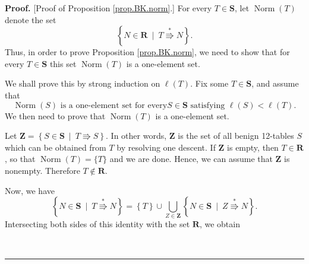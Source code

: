 \documentclass[numbers=enddot,12pt,final,onecolumn,notitlepage]{scrartcl}%
\theoremstyle{definition}
\newenvironment{proof}[1][Proof]{\noindent\textbf{#1.} }{\ \rule{0.5em}{0.5em}}
\begin{document}
\begin{proof}
[Proof of Proposition \ref{prop.BK.norm}.] For every $T\in\mathbf{S}$, let
$\operatorname*{Norm}\left(  T\right)  $ denote the set%
\[
\left\{  N\in\mathbf{R}\ \mid\ T\overset{\ast}{\Rrightarrow}N\right\}  .
\]
Thus, in order to prove Proposition \ref{prop.BK.norm}, we need to show that for every $T\in\mathbf{S}$ this set $\operatorname*{Norm}%
\left(  T\right)  $ is a one-element set.

We shall prove this by strong induction on $\ell\left(  T\right)  $. Fix
some $T\in\mathbf{S}$, and assume that
\begin{equation}
\operatorname*{Norm}\left(  S\right)  \text{ is a one-element set for every
}S\in\mathbf{S}\text{ satisfying }\ell\left(  S\right)  <\ell\left(  T\right)
\text{.}\label{pf.prop.BK.norm.indhyp}%
\end{equation}
We then need to prove that $\operatorname*{Norm}\left(  T\right)  $ is a
one-element set.

Let $\mathbf{Z} = \left\{  S\in\mathbf{S}\ \mid\ T\Rrightarrow
S\right\}  $. In other words, $\mathbf{Z}$ is the set of all benign 12-tables
$S$ which can be obtained from $T$ by resolving one descent. If
$\mathbf{Z}$ is empty, then $T \in \mathbf{R}$, so that
$\operatorname*{Norm}\left(  T\right) = \{T\}$ and we are done. Hence, we can
assume that $\mathbf{Z}$ is nonempty. Therefore $T \notin \mathbf{R}$.

Now, we have
\[
\left\{  N\in\mathbf{S}\ \mid\ T\overset{\ast}{\Rrightarrow}N\right\}
=\left\{  T\right\}  \cup\bigcup_{Z\in\mathbf{Z}}\left\{  N\in\mathbf{S}%
\ \mid\ Z\overset{\ast}{\Rrightarrow}N\right\}  .
\]
Intersecting both sides of this identity with the set $\mathbf{R}$, we obtain%

\begin{comment}

\begin{align*}
\left\{  N\in\mathbf{R}\ \mid\ T\overset{\ast}{\Rrightarrow}N\right\}    &
=\underbrace{\left(  \left\{  T\right\}  \cap\mathbf{R}\right)  }%
_{\substack{=\varnothing\\\text{(since }T\notin\mathbf{R}\text{)}}}\cup
\bigcup_{Z\in\mathbf{Z}}\underbrace{\left\{  N\in\mathbf{R}\ \mid
\ Z\overset{\ast}{\Rrightarrow}N\right\}  }_{\substack{=\operatorname*{Norm}%
\left(  Z\right)  \\\text{(by the definition }\\\text{of }\operatorname*{Norm}\left(
Z\right)  \text{)}}}
 =\bigcup_{Z\in\mathbf{Z}}\operatorname*{Norm}\left(  Z\right)  .
\end{align*}
Thus,
\begin{equation}
\operatorname*{Norm}\left(  T\right)  =\left\{  N\in\mathbf{R}\ \mid
\ T\overset{\ast}{\Rrightarrow}N\right\}  =\bigcup_{Z\in\mathbf{Z}%
}\operatorname*{Norm}\left(  Z\right)  .\label{pf.prop.BK.norm.union}%
\end{equation}
 

\end{comment}
\end{proof}
\end{document}
